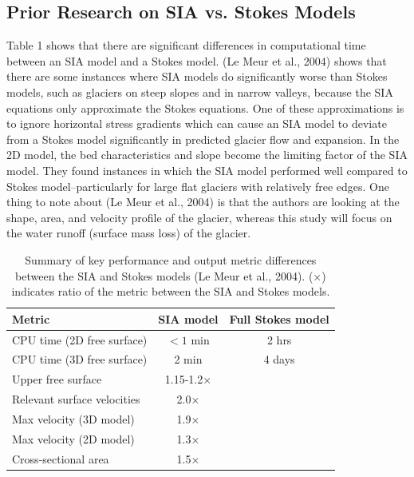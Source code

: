 \documentclass{article}
\begin{document}
\subsection{Prior Research on SIA vs. Stokes Models}
Table 1 shows that there are significant differences in computational time between an SIA model and a Stokes model. 
(Le Meur et al., 2004) shows that there are some instances where SIA models do significantly worse than 
Stokes models, such as glaciers on steep slopes and in narrow valleys, because the SIA equations only approximate the Stokes 
equations. One of these approximations is to ignore horizontal stress gradients which can cause an SIA model to deviate from a Stokes model 
significantly in predicted glacier flow and expansion. In the 2D model, the bed characteristics and slope become the limiting factor of the SIA model.
They found instances in which the SIA model performed well 
compared to Stokes model--particularly for large flat glaciers with relatively free edges. One thing to note about (Le Meur et al., 2004) is 
that the authors are looking at the shape, area, and velocity profile of the glacier, whereas this study will focus on the water runoff 
(surface mass loss) of the glacier.
\begin{table}[ht]
    \centering
    \begin{tabular}{lcc}
      \hline
      \textbf{Metric} & \textbf{SIA model} & \textbf{Full Stokes model} \\
      \hline
      CPU time (2D free surface)                & $<1$ min        & 2 hrs    \\
      CPU time (3D free surface)                & 2 min  & 4 days    \\
      Upper free surface        & 1.15-1.2×    &    \\
      Relevant surface velocities    & 2.0×   &      \\
      Max velocity (3D model)               & 1.9×         &       \\
      Max velocity (2D model)               & 1.3×         &        \\
      Cross-sectional area        & 1.5×         &       \\
      \hline
    \end{tabular}
    \caption{Summary of key performance and output metric differences between the SIA and Stokes models (Le Meur et al., 2004). (×) indicates ratio of the metric between the SIA and Stokes models.}
    \label{tab:sia_vs_stokes}
  \end{table}
\FloatBarrier  
  
\end{document}
